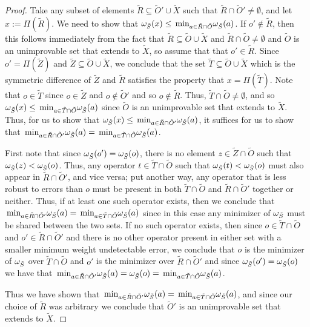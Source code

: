\documentclass[twocolumn,showpacs,preprintnumbers,amsmath,amssymb,nofootinbib,pra,floatfix]{revtex4-1}
\newcommand{\set}{\tilde}
\begin{document}
\begin{proof}
Take any subset of elements $\set R\subseteq\set O'\cup\set X$ such that $\set R\cap\set O'\ne\emptyset$, and let $x := \Pi(\set R)$.  We need to show that $\om_{\set S}(x) \le \min_{a\in\set R\cap\set O}\om_{\set S}(a)$.  If $o'\notin\set R$, then this follows immediately from the fact that $\set R\subseteq\set O\cup \set X$ and $\set R\cap\set O\ne\emptyset$ and $\set O$ is an unimprovable set that extends to $\set X$, so assume that that $o'\in\set R$.  Since $o'=\Pi(\set Z)$ and $\set Z\subseteq\set O\cup\set X$, we conclude that the set $\set T\subseteq\set O\cup\set X$ which is the symmetric difference of $\set Z$ and $\set R$ satisfies the property that $x=\Pi(\set T)$.  Note that $o\in\set T$ since $o\in \set Z$ and $o\notin \set O'$ and so $o\notin \set R$.  Thus, $\set T \cap\set O\ne\emptyset$, and so $\om_{\set S}(x)\le \min_{a\in\set T\cap\set O}\om_{\set S}(a)$ since $\set O$ is an unimprovable set that extends to $\set X$.  Thus, for us to show that $\om_{\set S}(x) \le \min_{a\in\set R\cap\set O'}\om_{\set S}(a)$, it suffices for us to show that $\min_{a\in\set R\cap\set O'}\om_{\set S}(a)=\min_{a\in\set T\cap\set O}\om_{\set S}(a)$.

First note that since $\om_{\set S}(o')=\om_{\set S}(o)$, there is no element $z\in\set Z\cap\set O$ such that $\om_{\set S}(z)<\om_{\set S}(o)$.  Thus, any operator $t\in\set T\cap\set O$ such that $\om_{\set S}(t)<\om_{\set S}(o)$ must also appear in $\set R\cap\set O'$, and vice versa;  put another way, any operator that is less robust to errors than $o$ must be present in both $\set T\cap\set O$ and $\set R\cap\set O'$ together or neither.  Thus, if at least one such operator exists, then we conclude that $\min_{a\in\set R\cap\set O'}\om_{\set S}(a)=\min_{a\in\set T\cap\set O}\om_{\set S}(a)$ since in this case any minimizer of $\om_{\set S}$ must be shared between the two sets.  If no such operator exists, then since $o\in\set T\cap\set O$ and $o'\in\set R\cap\set O'$ and there is no other operator present in either set with a smaller minimum weight undetectable error, we conclude that $o$ is the minimizer of $\om_{\set S}$ over $\set T\cap\set O$ and $o'$ is the minimizer over $\set R\cap\set O'$ and since $\om_{\set S}(o')=\om_{\set S}(o)$ we have that $\min_{a\in\set R\cap\set O'}\om_{\set S}(a)=\om_{\set S}(o)=\min_{a\in\set T\cap\set O}\om_{\set S}(a)$.

Thus we have shown that $\min_{a\in\set R\cap\set O'}\om_{\set S}(a)=\min_{a\in\set T\cap\set O}\om_{\set S}(a)$, and since our choice of $\set R$ was arbitrary we conclude that $\set O'$ is an unimprovable set that extends to $\set X$.
\end{proof}
\end{document}
